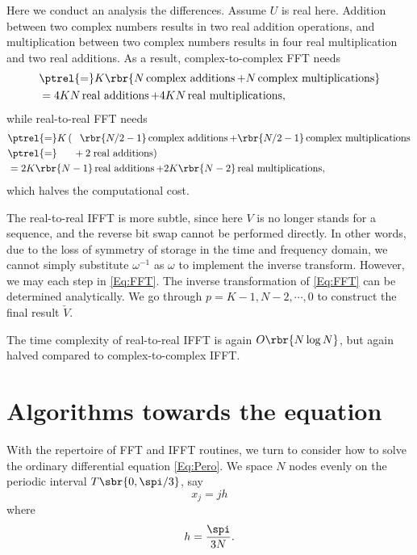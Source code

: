 \documentclass[english, nochinese]{pnote}
\begin{document}
Here we conduct an analysis the differences. Assume $U$ is real here. Addition between two complex numbers results in two real addition operations, and multiplication between two complex numbers results in four real multiplication and two real additions. As a result, complex-to-complex FFT needs
\begin{equation}
\begin{split}
&\ptrel{=} K \rbr{ N \mathop{\text{complex additions}} + N \mathop{\text{complex multiplications}} } \\
&= 4 K N \mathop{\text{real additions}} + 4 K N \mathop{\text{real multiplications}},
\end{split}
\end{equation}
while real-to-real FFT needs
\begin{equation}
\begin{split}
&\ptrel{=} K \left( \phantom{=} \rbr{ N / 2 - 1 } \mathop{\text{complex additions}} + \rbr{ N / 2 - 1 } \mathop{\text{complex multiplications}} \right. \\
&\ptrel{=} \phantom{ K \left( \right. } + 2 \left. \mathop{\text{real additions}} \right) \\
&= 2 K \rbr{ N - 1 } \mathop{\text{real additions}} + 2 K \rbr{ N - 2 } \mathop{\text{real multiplications}},
\end{split}
\end{equation}
which halves the computational cost.

The real-to-real IFFT is more subtle, since here $V$ is no longer stands for a sequence, and the reverse bit swap cannot be performed directly. In other words, due to the loss of symmetry of storage in the time and frequency domain, we cannot simply substitute $\omega^{-1}$ as $\omega$ to implement the inverse transform. However, we may each step in \eqref{Eq:FFT}. The inverse transformation of \eqref{Eq:FFT} can be determined analytically. We go through $ p = K - 1, N - 2, \cdots, 0 $ to construct the final result $\check{V}$.

The time complexity of real-to-real IFFT is again $ O \rbr{ N \log N } $, but again halved compared to complex-to-complex IFFT.

\section{Algorithms towards the equation}

With the repertoire of FFT and IFFT routines, we turn to consider how to solve the ordinary differential equation \eqref{Eq:Pero}. We space $N$ nodes evenly on the periodic interval $ T \sbr{ 0, \spi / 3 } $, say
\begin{equation}
x_j = j h
\end{equation}
where
\begin{equation}
h = \frac{\spi}{ 3 N }.
\end{equation}
\end{document}
